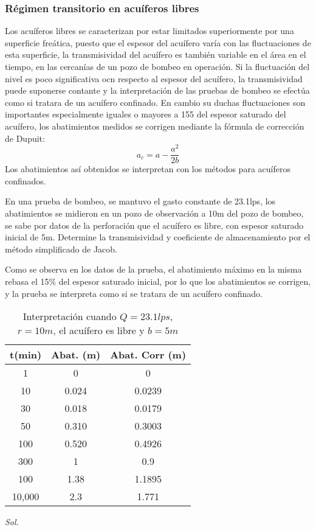 \subsubsection{Régimen transitorio en acuíferos libres}
Los acuíferos libres se caracterizan por estar  limitados superiormente por una superficie freática, puesto que el espesor del acuífero varía con las fluctuaciones de esta superficie, la transmisividad del acuífero es también variable en el área en el tiempo, en las cercanías de un pozo de bombeo en operación. Si la fluctuación del nivel es poco significativa ocn respecto al espesor del acuífero, la transmisividad puede suponerse contante y la interpretación de las pruebas de bombeo se efectúa como si tratara de un acuífero confinado. En cambio su duchas fluctuaciones son importantes especialmente iguales o mayores a 155 del espesor saturado del acuífero, los abatimientos medidos se corrigen mediante la fórmula de corrección de Dupuit:
\begin{equation}
    a_c= a-\frac{a^2}{2b}
\end{equation}
Los abatimientos así obtenidos se interpretan con los métodos para acuíferos confinados.
\begin{example}
En una prueba de bombeo, se mantuvo el gasto constante de 23.1lps, los abatimientos se midieron en un pozo de observación a 10m del pozo de bombeo, se sabe por datos de la perforación que el acuífero es libre, con espesor saturado inicial de 5m. Determine la transmisividad y coeficiente de almacenamiento por el método simplificado de Jacob.

Como se observa en los datos de la prueba, el abatimiento máximo en la misma rebasa el 15\% del espesor saturado inicial, por lo que los abatimientos se corrigen, y la prueba se interpreta como si se tratara de un acuífero confinado.
\begin{table}[h!]
    \centering
    \begin{tabular}{@{}ccc@{}}
    \toprule
    t(min) & Abat. (m) & Abat. Corr (m) \\ \midrule
    1      & 0         & 0              \\
    10     & 0.024     & 0.0239         \\
    30     & 0.018     & 0.0179         \\
    50     & 0.310     & 0.3003         \\
    100    & 0.520     & 0.4926         \\
    300    & 1         & 0.9            \\
    100    & 1.38      & 1.1895         \\
    10,000 & 2.3       & 1.771          \\ \bottomrule
\end{tabular}
\caption{Interpretación cuando $Q=23.1lps$, $r=10m$, el acuífero es libre y $b=5m$}
\label{tabgh12}
\end{table}
\end{example}
\textit{ Sol. }

